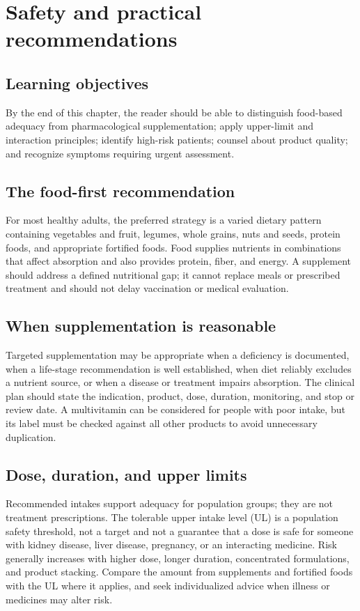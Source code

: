 \chapter{Safety and practical recommendations}

\section{Learning objectives}
By the end of this chapter, the reader should be able to distinguish food-based adequacy from pharmacological supplementation; apply upper-limit and interaction principles; identify high-risk patients; counsel about product quality; and recognize symptoms requiring urgent assessment.

\section{The food-first recommendation}
For most healthy adults, the preferred strategy is a varied dietary pattern containing vegetables and fruit, legumes, whole grains, nuts and seeds, protein foods, and appropriate fortified foods. Food supplies nutrients in combinations that affect absorption and also provides protein, fiber, and energy. A supplement should address a defined nutritional gap; it cannot replace meals or prescribed treatment and should not delay vaccination or medical evaluation. \cite{who,odsSafety}

\section{When supplementation is reasonable}
Targeted supplementation may be appropriate when a deficiency is documented, when a life-stage recommendation is well established, when diet reliably excludes a nutrient source, or when a disease or treatment impairs absorption. The clinical plan should state the indication, product, dose, duration, monitoring, and stop or review date. A multivitamin can be considered for people with poor intake, but its label must be checked against all other products to avoid unnecessary duplication. \cite{odsSafety,odsMVMS}

\section{Dose, duration, and upper limits}
Recommended intakes support adequacy for population groups; they are not treatment prescriptions. The tolerable upper intake level (UL) is a population safety threshold, not a target and not a guarantee that a dose is safe for someone with kidney disease, liver disease, pregnancy, or an interacting medicine. Risk generally increases with higher dose, longer duration, concentrated formulations, and product stacking. Compare the amount from supplements and fortified foods with the UL where it applies, and seek individualized advice when illness or medicines may alter risk. \cite{nap,odsSafety}

